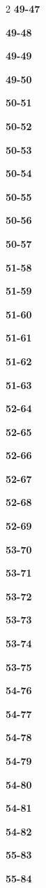 \documentclass[10pt,a4paper]{article}
\begin{document}
\begin{multicols}{2}
\noindent\textbf{49-47}\ \par
\noindent\textbf{49-48}\ \par
\noindent\textbf{49-49}\ \par
\noindent\textbf{49-50}\ \par
\noindent\textbf{50-51}\ \par
\noindent\textbf{50-52}\ \par
\noindent\textbf{50-53}\ \par
\noindent\textbf{50-54}\ \par
\noindent\textbf{50-55}\ \par
\noindent\textbf{50-56}\ \par
\noindent\textbf{50-57}\ \par
\noindent\textbf{51-58}\ \par
\noindent\textbf{51-59}\ \par
\noindent\textbf{51-60}\ \par
\noindent\textbf{51-61}\ \par
\noindent\textbf{51-62}\ \par
\noindent\textbf{51-63}\ \par
\noindent\textbf{52-64}\ \par
\noindent\textbf{52-65}\ \par
\noindent\textbf{52-66}\ \par
\noindent\textbf{52-67}\ \par
\noindent\textbf{52-68}\ \par
\noindent\textbf{52-69}\ \par
\noindent\textbf{53-70}\ \par
\noindent\textbf{53-71}\ \par
\noindent\textbf{53-72}\ \par
\noindent\textbf{53-73}\ \par
\noindent\textbf{53-74}\ \par
\noindent\textbf{53-75}\ \par
\noindent\textbf{54-76}\ \par
\noindent\textbf{54-77}\ \par
\noindent\textbf{54-78}\ \par
\noindent\textbf{54-79}\ \par
\noindent\textbf{54-80}\ \par
\noindent\textbf{54-81}\ \par
\noindent\textbf{54-82}\ \par
\noindent\textbf{55-83}\ \par
\noindent\textbf{55-84}\ \par

\end{multicols}
\end{document}
